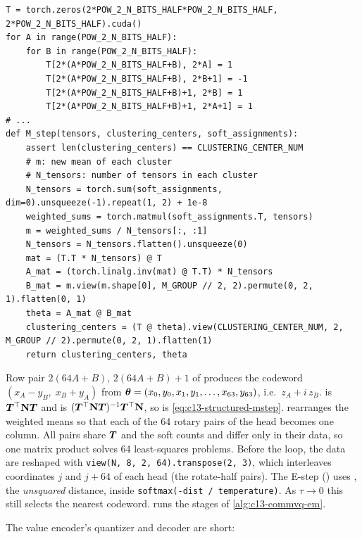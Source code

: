 \begin{lstlisting}[caption={Excerpt from \texttt{repos/UMass-Embodied-AGI\_\_CommVQ/training/quantize\_key\_cache.py}},label={lst:c13-commvq-mstep}]
T = torch.zeros(2*POW_2_N_BITS_HALF*POW_2_N_BITS_HALF, 2*POW_2_N_BITS_HALF).cuda()
for A in range(POW_2_N_BITS_HALF):
    for B in range(POW_2_N_BITS_HALF):
        T[2*(A*POW_2_N_BITS_HALF+B), 2*A] = 1
        T[2*(A*POW_2_N_BITS_HALF+B), 2*B+1] = -1
        T[2*(A*POW_2_N_BITS_HALF+B)+1, 2*B] = 1
        T[2*(A*POW_2_N_BITS_HALF+B)+1, 2*A+1] = 1
# ...
def M_step(tensors, clustering_centers, soft_assignments):
    assert len(clustering_centers) == CLUSTERING_CENTER_NUM
    # m: new mean of each cluster
    # N_tensors: number of tensors in each cluster
    N_tensors = torch.sum(soft_assignments, dim=0).unsqueeze(-1).repeat(1, 2) + 1e-8
    weighted_sums = torch.matmul(soft_assignments.T, tensors)
    m = weighted_sums / N_tensors[:, :1]
    N_tensors = N_tensors.flatten().unsqueeze(0)
    mat = (T.T * N_tensors) @ T
    A_mat = (torch.linalg.inv(mat) @ T.T) * N_tensors
    B_mat = m.view(m.shape[0], M_GROUP // 2, 2).permute(0, 2, 1).flatten(0, 1)
    theta = A_mat @ B_mat
    clustering_centers = (T @ theta).view(CLUSTERING_CENTER_NUM, 2, M_GROUP // 2).permute(0, 2, 1).flatten(1)
    return clustering_centers, theta
\end{lstlisting}

\begin{implnote}[title={In the code: reading the M-step}]
Row pair $2(64A+B),\,2(64A+B)+1$ of  produces the codeword $(x_A-y_B,\;x_B+y_A)$ from
$\bm{\theta}=(x_0,y_0,x_1,y_1,\dots,x_{63},y_{63})$, i.e.\ $z_A+i\,z_B$.  is
$\bm{T}^{\top}\mathbf{N}\bm{T}$ and  is $(\bm{T}^{\top}\mathbf{N}\bm{T})^{-1}\bm{T}^{\top}\mathbf{N}$, so  is
\eqref{eq:c13-structured-mstep}.  rearranges the weighted means so that each of the 64 rotary
pairs of the head becomes one column. All pairs share $\bm{T}$ and the soft counts and differ only in their
data, so one matrix product solves 64 least-squares problems. Before the loop, the data are reshaped
with \texttt{view(N, 8, 2, 64).transpose(2, 3)}, which interleaves coordinates $j$ and $j+64$ of each head
(the rotate-half pairs). The E-step () uses , the \emph{unsquared}
distance, inside \texttt{softmax(-dist / temperature)}. As $\tau\to0$ this still selects the nearest
codeword.  runs the stages of \cref{alg:c13-commvq-em}.
\end{implnote}

The value encoder's quantizer and decoder are short:

